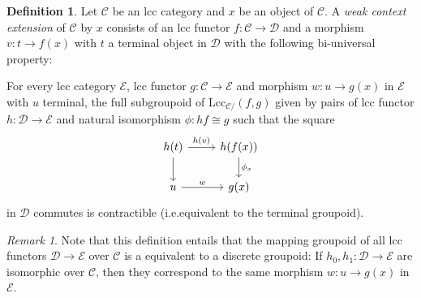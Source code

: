 \documentclass[a4paper]{article}
\theoremstyle{remark}
\newtheorem{remark}[theorem]{Remark}
\theoremstyle{definition}
\newtheorem{definition}[theorem]{Definition}
\begin{document}
\begin{definition}
  \label{def:weak-ext}
  Let $\mathcal{C}$ be an lcc category and $x$ be an object of $\mathcal{C}$.
  A \emph{weak context extension} of $\mathcal{C}$ by $x$ consists of an lcc functor $f : \mathcal{C} \rightarrow \mathcal{D}$ and a morphism $v : t \rightarrow f(x)$ with $t$ a terminal object in $\mathcal{D}$ with the following bi-universal property:

  For every lcc category $\mathcal{E}$, lcc functor $g : \mathcal{C} \rightarrow \mathcal{E}$ and morphism $w : u \rightarrow g(x)$ in $\mathcal{E}$ with $u$ terminal, the full subgroupoid of $\mathrm{Lcc}_{\mathcal{C} /}(f, g)$ given by pairs of lcc functor $h : \mathcal{D} \rightarrow \mathcal{E}$ and natural isomorphism $\phi : hf \cong g$ such that the square
  \begin{equation}
    \begin{tikzcd}
      h(t) \arrow[d] \arrow[r, "h(v)"] & h(f(x)) \arrow[d, "\phi_x"] \\
      u \arrow[r, "w"] & g(x)
    \end{tikzcd}
  \end{equation}
  in $\mathcal{D}$ commutes is contractible (i.e.\@ equivalent to the terminal groupoid).
\end{definition}

\begin{remark}
  \label{rem:discrete-weak-ext-mapping}
Note that this definition entails that the mapping groupoid of all lcc functors $\mathcal{D} \rightarrow \mathcal{E}$ over $\mathcal{C}$ is a equivalent to a discrete groupoid:
If $h_0, h_1 : \mathcal{D} \rightarrow \mathcal{E}$ are isomorphic over $\mathcal{C}$, then they correspond to the same morphism $w : u \rightarrow g(x)$ in $\mathcal{E}$.
\end{remark}
\end{document}

